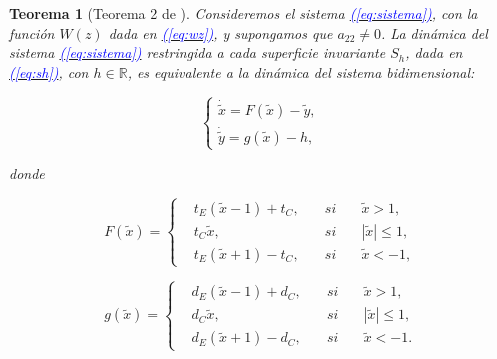 \documentclass[12pt,a4paper]{report} %
\newtheorem{theorem}{Teorema}[chapter]
\newcommand{\eref}[1]{\hyperref[#1]{\textcolor{blue}{(\ref*{#1})}}}
\begin{document}
	\vspace{0.5cm}
	
	\begin{theorem}[Teorema 2 de \cite{ponce}]
		Consideremos el sistema \eref{eq:sistema}, con la función $W(z)$ dada en \eref{eq:wz}, y supongamos que $a_{22}\neq 0$. La dinámica del sistema \eref{eq:sistema} restringida a cada superficie invariante $S_h$, dada en \eref{eq:sh}, con $h \in \mathbb{R}$, es equivalente a la dinámica del sistema bidimensional:
		
		\begin{equation}
			\label{eq:sis2ec}
			\left\{
			\begin{gathered}
				\dot{\tilde{x}}=F(\tilde{x})-\tilde{y}, \\[2mm]
				\dot{\tilde{y}}=g(\tilde{x})-h,
			\end{gathered}
			\right.
		\end{equation}
		
		donde
		
		\begin{equation}
			\label{eq:f1}
			F(\tilde{x})=
			\left\{
			\begin{aligned}
				&t_E(\tilde{x}-1)+t_C, \quad &si& \quad \tilde{x}>1,\\
				&t_C\tilde{x}, &si& \quad |\tilde{x}|\leq 1,\\
				&t_E(\tilde{x}+1)-t_C, \quad &si& \quad \tilde{x}<-1,
			\end{aligned}
			\right.
		\end{equation}\smallskip
		
		\begin{equation}
			\label{eq:g1}
			g(\tilde{x})=
			\left\{
			\begin{aligned}
				&d_E(\tilde{x}-1)+d_C, \quad &si& \quad \tilde{x}>1,\\
				&d_C\tilde{x}, &si& \quad |\tilde{x}|\leq 1,\\
				&d_E(\tilde{x}+1)-d_C, \quad &si& \quad \tilde{x}<-1.
			\end{aligned}
			\right.
		\end{equation}\smallskip
		
	\end{theorem}
	
	\vspace{0.5cm}
		
\end{document}
